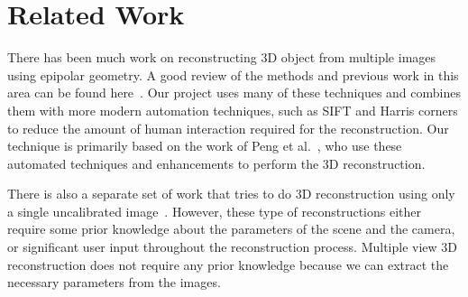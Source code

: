 \section{Related Work}
\label{s:related}
There has been much work on reconstructing 3D object from multiple images using epipolar geometry. A good review of the methods and previous work in this area can be found here~\cite{epipolar_review}. Our project uses many of these techniques and combines them with more modern automation techniques, such as SIFT and Harris corners to reduce the amount of human interaction required for the reconstruction. Our technique is primarily based on the work of Peng et al.~\cite{SIFT/Harris}, who use these automated techniques and enhancements to perform the 3D reconstruction.

There is also a separate set of work that tries to do 3D reconstruction using only a single uncalibrated image~\cite{single_image, single_image2}. However, these type of reconstructions either require some prior knowledge about the parameters of the scene and the camera, or significant user input throughout the reconstruction process. Multiple view 3D reconstruction does not require any prior knowledge because we can extract the necessary parameters from the images.